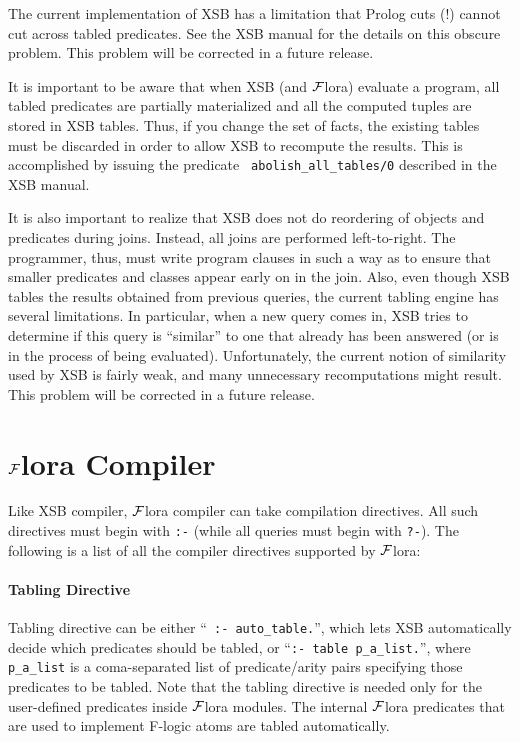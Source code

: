 \documentclass[11pt]{article}
\newcommand{\FLORA}{{\mbox{${\cal F}${\sc lora}}}\xspace}
\newcommand{\fl}{{F-logic}\xspace}
\begin{document}
The current implementation of XSB has a limitation that Prolog cuts (!)
cannot cut across tabled predicates. See the XSB manual for the details on
this obscure problem. This problem will be corrected in a future release.

It is important to be aware that when XSB (and \FLORA) evaluate a program,
all tabled predicates are partially materialized and all the computed
tuples are stored in XSB tables. Thus, if you change the set of facts, the
existing tables must be discarded in order to allow XSB to recompute the
results. This is accomplished by issuing the predicate {\tt
  abolish\_all\_tables/0} described in the XSB manual.

It is also important to realize that XSB does not do reordering of objects
and predicates during joins. Instead, all joins are performed left-to-right.
The programmer, thus, must write program clauses in such a way as to ensure
that smaller predicates and classes appear early on in the join. Also, even
though XSB tables the results obtained from previous queries, the current
tabling engine has several limitations. In particular, when a new query
comes in, XSB tries to determine if this query is ``similar'' to one that
already has been answered (or is in the process of being evaluated).
Unfortunately, the current notion of similarity used by XSB is fairly weak,
and many unnecessary recomputations might result. This problem will be
corrected in a future release.


\section{\FLORA Compiler} \label{sec-comp-directives}

Like XSB compiler, \FLORA compiler can take compilation directives. All
such directives must begin with {\tt :-} (while all queries must begin with
{\tt ?-}). The following is a list of all the compiler directives supported
by \FLORA:

\paragraph{Tabling Directive} Tabling directive can be either ``{\tt
  :- auto\_table.}'', which lets XSB automatically decide which predicates
should be tabled, or ``{\tt :- table p\_a\_list.}'', where {\tt p\_a\_list}
is a coma-separated list of \mbox{predicate/arity} pairs specifying those
predicates to be tabled. Note that the tabling directive is needed only for
the user-defined predicates inside \FLORA modules. The internal \FLORA
predicates that are used to implement \fl atoms are tabled automatically.
\end{document}
